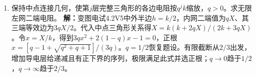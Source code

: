 \documentclass[UTF8,fontset=fandol,a4paper,11pt]{ctexart}
\begin{document}
\begin{enumerate}
\item 保持中点连接几何，使第$j$层完整三角形的各边电阻按$q^jk$缩放，$q>0$。求无限左网二端电阻。
\textbf{解：}变图电试4.2V5中外半边$h=k/2$，内网二端值为$qX$、其三端等效边为$3qX/2$。代入中点三角形关系得$X=k(k+2qX)/(2k+3qX)$。令$x=X/k$，得到$3qx^2+2(1-q)x-1=0$，正根$x=[q-1+\sqrt{q^2+q+1}]/(3q)$。$q=1/2$恢复题设。有限截断从$2/3$出发，增加导电层给递减且有正下界的序列，极限满足此式并选正根；$q\to0$趋于$1/2$，$q\to\infty$趋于$2/3$。
\begin{center}\begin{minipage}{.98\linewidth}\centering
{}
\end{minipage}
\end{center}
\end{enumerate}
\end{document}
